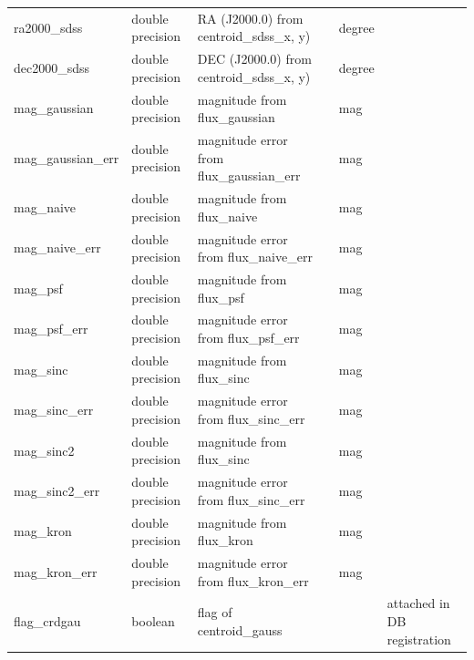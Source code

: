 \documentclass[12pt]{article}
\begin{document}
\begin{table}[thpb]
\begin{center}
{\begin{tabular}{llllll}
ra2000\_sdss & double precision & RA (J2000.0) from centroid\_sdss\_x, y)               &                            & degree      &   \\
dec2000\_sdss & double precision & DEC (J2000.0) from centroid\_sdss\_x, y)              &                            & degree      &   \\
mag\_gaussian & double precision & magnitude from flux\_gaussian                        &                            & mag         &   \\
mag\_gaussian\_err & double precision & magnitude error from flux\_gaussian\_err                &                            & mag         &   \\
mag\_naive & double precision & magnitude from flux\_naive                           &                            & mag         &   \\
mag\_naive\_err & double precision & magnitude error from flux\_naive\_err                   &                            & mag         &   \\
mag\_psf & double precision & magnitude from flux\_psf                             &                            & mag         &   \\
mag\_psf\_err & double precision & magnitude error from flux\_psf\_err                     &                            & mag         &   \\
mag\_sinc & double precision & magnitude from flux\_sinc                            &                            & mag         &   \\
mag\_sinc\_err & double precision & magnitude error from flux\_sinc\_err                    &                            & mag         &   \\
mag\_sinc2 & double precision & magnitude from flux\_sinc                            &                            & mag         &   \\
mag\_sinc2\_err & double precision & magnitude error from flux\_sinc\_err                    &                            & mag         &   \\
mag\_kron & double precision & magnitude from flux\_kron                            &                            & mag         &   \\
mag\_kron\_err & double precision & magnitude error from flux\_kron\_err                    &                            & mag         &   \\
flag\_crdgau & boolean & flag of centroid\_gauss                              &                            &             & attached in DB registration  \\

\end{tabular}}
\end{center}
\end{table}
\end{document}
